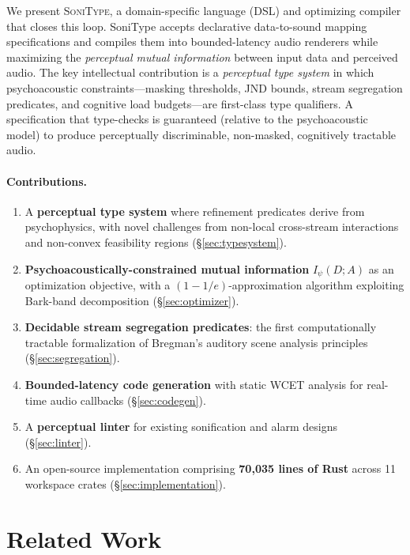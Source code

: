 \documentclass[sigchi, nonacm]{acmart}
\begin{document}
We present \textsc{SoniType}, a domain-specific language (DSL) and optimizing compiler that closes this loop. SoniType accepts declarative data-to-sound mapping specifications and compiles them into bounded-latency audio renderers while maximizing the \emph{perceptual mutual information} between input data and perceived audio. The key intellectual contribution is a \emph{perceptual type system} in which psychoacoustic constraints---masking thresholds, JND bounds, stream segregation predicates, and cognitive load budgets---are first-class type qualifiers. A specification that type-checks is guaranteed (relative to the psychoacoustic model) to produce perceptually discriminable, non-masked, cognitively tractable audio.

\paragraph{Contributions.}
\begin{enumerate}
    \item A \textbf{perceptual type system} where refinement predicates derive from psychophysics, with novel challenges from non-local cross-stream interactions and non-convex feasibility regions (\S\ref{sec:typesystem}).
    \item \textbf{Psychoacoustically-constrained mutual information} $I_\psi(D; A)$ as an optimization objective, with a $(1-1/e)$-approximation algorithm exploiting Bark-band decomposition (\S\ref{sec:optimizer}).
    \item \textbf{Decidable stream segregation predicates}: the first computationally tractable formalization of Bregman's auditory scene analysis principles (\S\ref{sec:segregation}).
    \item \textbf{Bounded-latency code generation} with static WCET analysis for real-time audio callbacks (\S\ref{sec:codegen}).
    \item A \textbf{perceptual linter} for existing sonification and alarm designs (\S\ref{sec:linter}).
    \item An open-source implementation comprising \textbf{70,035 lines of Rust} across 11 workspace crates (\S\ref{sec:implementation}).
\end{enumerate}

\section{Related Work}
\label{sec:related}
\end{document}
